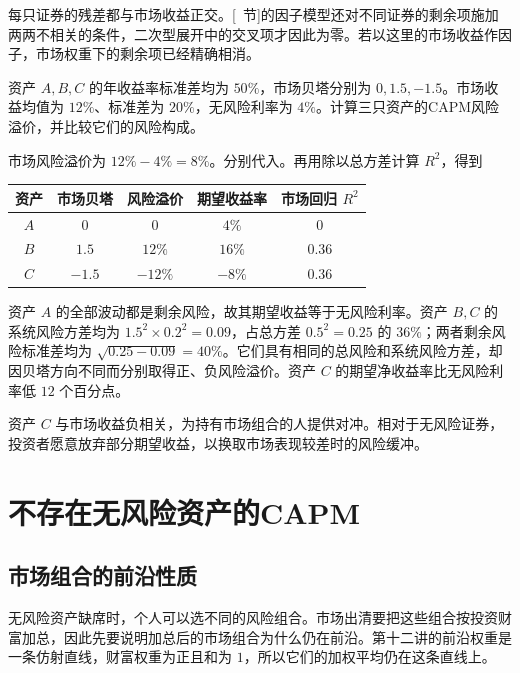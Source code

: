 每只证券的残差都与市场收益正交。[~节]的因子模型还对不同证券的剩余项施加两两不相关的条件，二次型展开中的交叉项才因此为零。若以这里的市场收益作因子，市场权重下的剩余项已经精确相消。

\begin{tcolorbox}[example]
\begin{question}
 资产 $A,B,C$ 的年收益率标准差均为 $50\%$，市场贝塔分别为 $0,1.5,-1.5$。市场收益均值为 $12\%$、标准差为 $20\%$，无风险利率为 $4\%$。计算三只资产的CAPM风险溢价，并比较它们的风险构成。

\end{question}
\begin{solution}
市场风险溢价为 $12\%-4\%=8\%$。分别代入。再用除以总方差计算 $R^2$，得到
\begin{center}
\begin{tabular}{ccccc}
\toprule
资产&市场贝塔&风险溢价&期望收益率&市场回归 $R^2$\\
\midrule
$A$&$0$&$0$&$4\%$&$0$\\
$B$&$1.5$&$12\%$&$16\%$&$0.36$\\
$C$&$-1.5$&$-12\%$&$-8\%$&$0.36$\\
\bottomrule
\end{tabular}
\end{center}

资产 $A$ 的全部波动都是剩余风险，故其期望收益等于无风险利率。资产 $B,C$ 的系统风险方差均为 $1.5^2\times0.2^2=0.09$，占总方差 $0.5^2=0.25$ 的 $36\%$；两者剩余风险标准差均为 $\sqrt{0.25-0.09}=40\%$。它们具有相同的总风险和系统风险方差，却因贝塔方向不同而分别取得正、负风险溢价。资产 $C$ 的期望净收益率比无风险利率低 $12$ 个百分点。

\end{solution}

\end{tcolorbox}

资产 $C$ 与市场收益负相关，为持有市场组合的人提供对冲。相对于无风险证券，投资者愿意放弃部分期望收益，以换取市场表现较差时的风险缓冲。

\section{不存在无风险资产的CAPM}\label{sec:wj-thirteen-4}
\subsection{市场组合的前沿性质}
无风险资产缺席时，个人可以选不同的风险组合。市场出清要把这些组合按投资财富加总，因此先要说明加总后的市场组合为什么仍在前沿。第十二讲的前沿权重是一条仿射直线，财富权重为正且和为 $1$，所以它们的加权平均仍在这条直线上。

